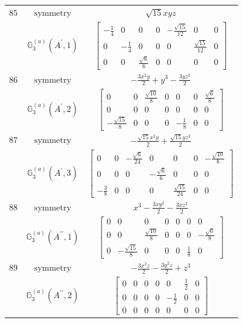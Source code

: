 \documentclass[fleqn,8pt,landscape]{jsarticle}
\begin{document}
\begin{longtable}{ccc}
$ 85 $ & $ \text{symmetry} $ & $ \sqrt{15} x y z $ \\
$  $ & $ \mathbb{G}_{3}^{(a)}(A^{\prime},1) $ & $ \begin{bmatrix} - \frac{1}{4} & 0 & 0 & 0 & - \frac{\sqrt{15}}{12} & 0 & 0 \\ 0 & - \frac{1}{4} & 0 & 0 & 0 & \frac{\sqrt{15}}{12} & 0 \\ 0 & 0 & \frac{\sqrt{6}}{6} & 0 & 0 & 0 & 0 \end{bmatrix} $ \\ \hline
$ 86 $ & $ \text{symmetry} $ & $ - \frac{3 x^{2} y}{2} + y^{3} - \frac{3 y z^{2}}{2} $ \\
$  $ & $ \mathbb{G}_{3}^{(a)}(A^{\prime},2) $ & $ \begin{bmatrix} 0 & 0 & \frac{\sqrt{10}}{8} & 0 & 0 & 0 & \frac{\sqrt{6}}{8} \\ 0 & 0 & 0 & 0 & 0 & 0 & 0 \\ - \frac{\sqrt{15}}{8} & 0 & 0 & 0 & - \frac{1}{8} & 0 & 0 \end{bmatrix} $ \\ \hline
$ 87 $ & $ \text{symmetry} $ & $ - \frac{\sqrt{15} x^{2} y}{2} + \frac{\sqrt{15} y z^{2}}{2} $ \\
$  $ & $ \mathbb{G}_{3}^{(a)}(A^{\prime},3) $ & $ \begin{bmatrix} 0 & 0 & - \frac{\sqrt{6}}{24} & 0 & 0 & 0 & - \frac{\sqrt{10}}{8} \\ 0 & 0 & 0 & - \frac{\sqrt{6}}{6} & 0 & 0 & 0 \\ - \frac{3}{8} & 0 & 0 & 0 & \frac{\sqrt{15}}{24} & 0 & 0 \end{bmatrix} $ \\ \hline
$ 88 $ & $ \text{symmetry} $ & $ x^{3} - \frac{3 x y^{2}}{2} - \frac{3 x z^{2}}{2} $ \\
$  $ & $ \mathbb{G}_{3}^{(a)}(A^{\prime\prime},1) $ & $ \begin{bmatrix} 0 & 0 & 0 & 0 & 0 & 0 & 0 \\ 0 & 0 & \frac{\sqrt{10}}{8} & 0 & 0 & 0 & - \frac{\sqrt{6}}{8} \\ 0 & - \frac{\sqrt{15}}{8} & 0 & 0 & 0 & \frac{1}{8} & 0 \end{bmatrix} $ \\ \hline
$ 89 $ & $ \text{symmetry} $ & $ - \frac{3 x^{2} z}{2} - \frac{3 y^{2} z}{2} + z^{3} $ \\
$  $ & $ \mathbb{G}_{3}^{(a)}(A^{\prime\prime},2) $ & $ \begin{bmatrix} 0 & 0 & 0 & 0 & 0 & \frac{1}{2} & 0 \\ 0 & 0 & 0 & 0 & - \frac{1}{2} & 0 & 0 \\ 0 & 0 & 0 & 0 & 0 & 0 & 0 \end{bmatrix} $ \\ \hline

\end{longtable}
\end{document}
